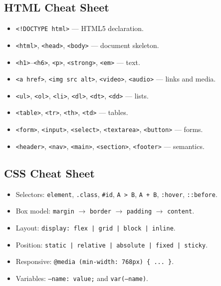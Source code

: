 \documentclass[hidelinks]{article}
\begin{document}
\subsection{HTML Cheat Sheet}
\begin{itemize}
  \item \texttt{<!DOCTYPE html>} --- HTML5 declaration.
  \item \texttt{<html>}, \texttt{<head>}, \texttt{<body>} --- document skeleton.
  \item \texttt{<h1>}--\texttt{<h6>}, \texttt{<p>}, \texttt{<strong>}, \texttt{<em>} --- text.
  \item \texttt{<a href>}, \texttt{<img src alt>}, \texttt{<video>}, \texttt{<audio>} --- links and media.
  \item \texttt{<ul>}, \texttt{<ol>}, \texttt{<li>}, \texttt{<dl>}, \texttt{<dt>}, \texttt{<dd>} --- lists.
  \item \texttt{<table>}, \texttt{<tr>}, \texttt{<th>}, \texttt{<td>} --- tables.
  \item \texttt{<form>}, \texttt{<input>}, \texttt{<select>}, \texttt{<textarea>}, \texttt{<button>} --- forms.
  \item \texttt{<header>}, \texttt{<nav>}, \texttt{<main>}, \texttt{<section>}, \texttt{<footer>} --- semantics.
\end{itemize}

\subsection{CSS Cheat Sheet}
\begin{itemize}
  \item Selectors: \texttt{element}, \texttt{.class}, \texttt{\#id}, \texttt{A > B}, \texttt{A + B}, \texttt{:hover}, \texttt{::before}.
  \item Box model: \texttt{margin} $\to$ \texttt{border} $\to$ \texttt{padding} $\to$ \texttt{content}.
  \item Layout: \texttt{display: flex | grid | block | inline}.
  \item Position: \texttt{static | relative | absolute | fixed | sticky}.
  \item Responsive: \texttt{@media (min-width: 768px) \{ ... \}}.
  \item Variables: \texttt{--name: value;} and \texttt{var(--name)}.
\end{itemize}
\end{document}
